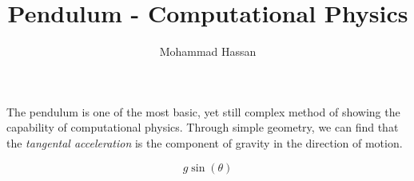 \documentclass{article}
\author{Mohammad Hassan}
\title{Pendulum - Computational Physics}
\begin{document}
    \maketitle

    The pendulum is one of the most basic, yet still complex method 
    of showing the capability of computational physics. Through simple 
    geometry, we can find that the \textit{tangental acceleration} is the 
    component of gravity in the direction of motion.

    \[g \sin(\theta)\]

    \begin{tikzpicture}

    \end{tikzpicture}
\end{document}
